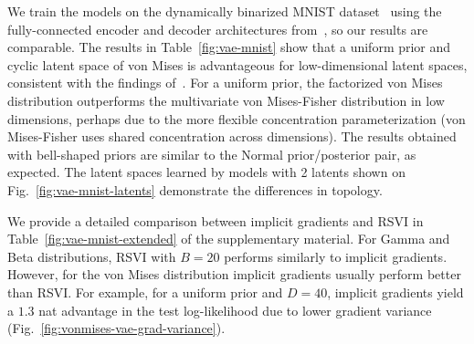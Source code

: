 \documentclass{article}
\begin{document}
We train the models on the dynamically binarized MNIST dataset~\cite{burda2016importance} using the fully-connected encoder and decoder architectures from~\cite{davidson2018hyperspherical}, so our results are comparable.
The results in Table~\ref{fig:vae-mnist} show that a uniform prior and cyclic latent space of von Mises is advantageous for low-dimensional latent spaces, consistent with the findings of~\cite{davidson2018hyperspherical}.
For a uniform prior, the factorized von Mises distribution outperforms the multivariate von Mises-Fisher distribution in low dimensions, perhaps due to the more flexible concentration parameterization (von Mises-Fisher uses shared concentration across dimensions).
The results obtained with bell-shaped priors are similar to the Normal prior/posterior pair, as expected.
The latent spaces learned by models with 2 latents shown on Fig.~\ref{fig:vae-mnist-latents} demonstrate the differences in topology.

We provide a detailed comparison between implicit gradients and RSVI in Table~\ref{fig:vae-mnist-extended} of the supplementary material.
For Gamma and Beta distributions, RSVI with $B=20$ performs similarly to implicit gradients.
However, for the von Mises distribution implicit gradients usually perform better than RSVI. For example, for a uniform prior and $D = 40$, implicit gradients yield a $1.3$ nat advantage in the test log-likelihood due to lower gradient variance (Fig.~\ref{fig:vonmises-vae-grad-variance}).
\end{document}
